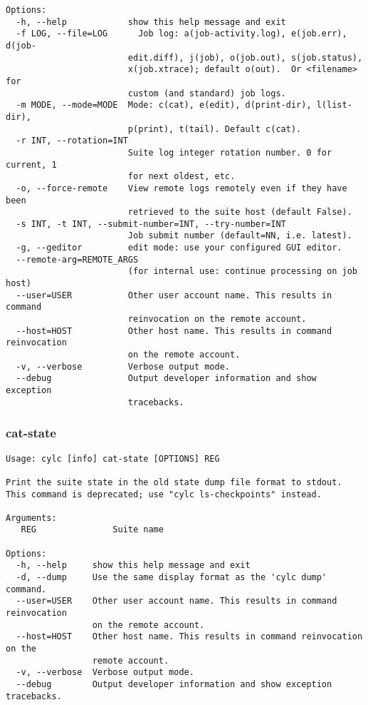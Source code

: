 \begin{lstlisting}
Options:
  -h, --help            show this help message and exit
  -f LOG, --file=LOG      Job log: a(job-activity.log), e(job.err), d(job-
                        edit.diff), j(job), o(job.out), s(job.status),
                        x(job.xtrace); default o(out).  Or <filename> for
                        custom (and standard) job logs.
  -m MODE, --mode=MODE  Mode: c(cat), e(edit), d(print-dir), l(list-dir),
                        p(print), t(tail). Default c(cat).
  -r INT, --rotation=INT
                        Suite log integer rotation number. 0 for current, 1
                        for next oldest, etc.
  -o, --force-remote    View remote logs remotely even if they have been
                        retrieved to the suite host (default False).
  -s INT, -t INT, --submit-number=INT, --try-number=INT
                        Job submit number (default=NN, i.e. latest).
  -g, --geditor         edit mode: use your configured GUI editor.
  --remote-arg=REMOTE_ARGS
                        (for internal use: continue processing on job host)
  --user=USER           Other user account name. This results in command
                        reinvocation on the remote account.
  --host=HOST           Other host name. This results in command reinvocation
                        on the remote account.
  -v, --verbose         Verbose output mode.
  --debug               Output developer information and show exception
                        tracebacks.
\end{lstlisting}
\subsubsection{cat-state}
\label{cat-state}
\begin{lstlisting}
Usage: cylc [info] cat-state [OPTIONS] REG

Print the suite state in the old state dump file format to stdout.
This command is deprecated; use "cylc ls-checkpoints" instead.

Arguments:
   REG               Suite name

Options:
  -h, --help     show this help message and exit
  -d, --dump     Use the same display format as the 'cylc dump' command.
  --user=USER    Other user account name. This results in command reinvocation
                 on the remote account.
  --host=HOST    Other host name. This results in command reinvocation on the
                 remote account.
  -v, --verbose  Verbose output mode.
  --debug        Output developer information and show exception tracebacks.
\end{lstlisting}

